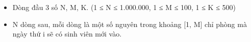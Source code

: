 \begin{itemize}
	\item     Dòng đầu 3 số N, M, K. (1 ≤ N ≤ 1.000.000, 1 ≤ M ≤ 100, 1 ≤ K ≤ 500)   
	\item     N dòng sau, mỗi dòng là một số nguyên trong khoảng [1, M] chỉ phòng mà ngày thứ i sẽ có sinh viên mới vào.   
\end{itemize}

\